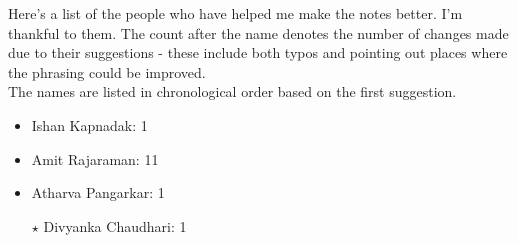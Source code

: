 Here's a list of the people who have helped me make the notes better. I'm thankful to them. The count after the name denotes the number of changes made due to their suggestions - these include both typos and pointing out places where the phrasing could be improved.\\
The names are listed in chronological order based on the first suggestion.\\

\begin{itemize}[nosep]
	\item Ishan Kapnadak: 1
	\item Amit Rajaraman: 11
	\item Atharva Pangarkar: 1
	\item[$\star$] Divyanka Chaudhari: 1
\end{itemize}